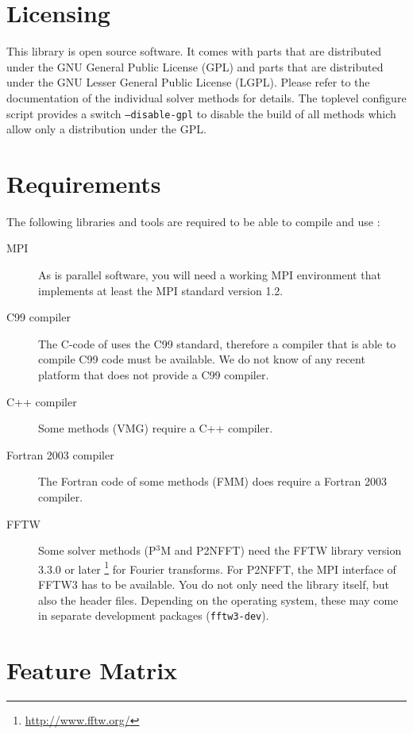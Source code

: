 \section{Licensing}

This library is open source software.  It comes with parts that are
distributed under the GNU General Public License (GPL) and parts that
are distributed under the GNU Lesser General Public License (LGPL).
Please refer to the documentation of the individual solver methods for
details.  The toplevel configure script provides a switch
\texttt{--disable-gpl} to disable the build of all methods which allow
only a distribution under the GPL.


\section{Requirements}
\label{sec:requirements}

The following libraries and tools are required to be able to compile
and use \fcs:

\begin{description}
\item[MPI]  As \fcs is parallel software, you will need a
  working MPI environment that implements at least the MPI standard
  version 1.2.
\item[C99 compiler]  The C-code of \fcs uses the C99
  standard, therefore a compiler that is able to compile C99 code must
  be available. We do not know of any recent platform that does not
  provide a C99 compiler.
\item[C++ compiler]  Some methods (\eg VMG) require a C++
  compiler.
\item[Fortran 2003 compiler]  The Fortran code of
  some methods (\eg FMM) does require a Fortran 2003 compiler.
\item[FFTW]  Some solver methods (\eg P$^3$M and P2NFFT)
  need the FFTW library version 3.3.0 or later
  \footnote{\url{http://www.fftw.org/}} for Fourier transforms.  For
  P2NFFT, the MPI interface of FFTW3 has to be available. You do
  not only need the library itself, but also the header files.
  Depending on the operating system, these may come in separate
  development packages (\eg \texttt{fftw3-dev}).
\end{description}

\section{Feature Matrix}
\label{sec:feature_matrix}

